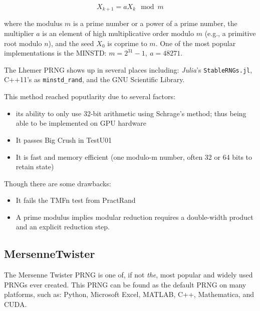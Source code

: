 \documentclass{article}
\begin{document}
            \begin{equation*}
                X_{k + 1} = a X_k \mod m
            \end{equation*}

            where the modulus $m$ is a prime number or a power of a prime number, the multiplier $a$ is an element of high multiplicative order modulo $m$ (e.g., a primitive root modulo $n$), and the seed $X_0$ is coprime to $m$.  One of the most popular implementations is the MINSTD: $m = 2^{31} - 1,\ a = 48271$.

            The Lhemer PRNG shows up in several places including: \emph{Julia}'s \texttt{StableRNGs.jl}\cite{StableRNGs}, C++11's as \texttt{minstd\_rand}\cite{CppLhemer}, and the GNU Scientific Library\cite{GNUSciLib}.

            This method reached poputlarity due to several factors:
            
            \begin{itemize}
                \item its ability to only use 32-bit arithmetic using Schrage's method; thus being able to be implemented on GPU hardware
                \item It passes Big Crush in TestU01\cite{TestU01}
                \item It is fast and memory efficient (one modulo-m number, often 32 or 64 bits to retain state)
            \end{itemize}
\pagebreak
            Though there are some drawbacks:

            \begin{itemize}
                \item It fails the TMFn test from PractRand\cite{Practrand}
                \item A prime modulus implies modular reduction requires a double-width product and an explicit reduction step.
            \end{itemize}
        
        \subsection*{MersenneTwister}

            The Mersenne Twister PRNG is one of, if not \emph{the}, most popular and widely used PRNGs ever created.  This PRNG can be found as the default PRNG on many platforms, such as: Python\cite{Python}, Microsoft Excel\cite{Excel}, MATLAB\cite{MATLAB}, C++\cite{CppMT}, Mathematica\cite{Mathematica}, and CUDA\cite{CUDA}.
\end{document}
